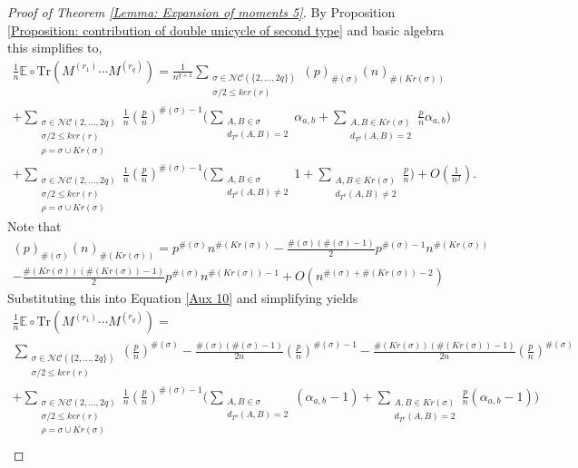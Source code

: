 \documentclass{article}
\theoremstyle{definition}
\newcommand{\E}{\mathbb{E}}
\newcommand{\NC}{\mathcal{NC}}
\newcommand{\Tr}{\text{Tr}}
\begin{document}
{\begin{proof}[Proof of Theorem \ref{Lemma: Expansion of moments 5}]
By Proposition \ref{Proposition: contribution of double unicycle of second type} and basic algebra this simplifies to,
\begin{multline}\label{Aux 10}
\frac{1}{n}\E\circ \Tr(M^{(r_1)}\cdots M^{(r_q)})= \frac{1}{n^{q+1}}\sum_{\substack{\sigma\in \NC(\{2,\dots,2q\}) \\ \sigma/2\leq ker(r)}}(p)_{\#(\sigma)}(n)_{\#(Kr(\sigma))} \\
+ \sum_{\substack{\sigma\in \NC(2,\dots,2q) \\ \sigma/2\leq ker(r) \\ \rho=\sigma\cup Kr(\sigma)}}\frac{1}{n}\left(\frac{p}{n}\right)^{\#(\sigma)-1}\Bigg(\sum_{\substack{A,B\in \sigma \\ d_{T^\rho}(A,B)=2}}\alpha_{a,b}+\sum_{\substack{A,B\in Kr(\sigma) \\ d_{T^\rho}(A,B)=2}}\frac{p}{n}\alpha_{a,b}\Bigg) \\
+ \sum_{\substack{\sigma\in \NC(2,\dots,2q) \\ \sigma/2\leq ker(r) \\ \rho=\sigma\cup Kr(\sigma)}}\frac{1}{n}\left(\frac{p}{n}\right)^{\#(\sigma)-1}\Bigg(\sum_{\substack{A,B\in \sigma \\ d_{T^\rho}(A,B)\neq 2}}1+\sum_{\substack{A,B\in Kr(\sigma) \\ d_{T^\rho}(A,B)\neq 2}}\frac{p}{n}\Bigg)+O(\frac{1}{n^2}).
\end{multline}
Note that 
\begin{multline*}
(p)_{\#(\sigma)}(n)_{\#(Kr(\sigma))}=p^{\#(\sigma)}n^{\#(Kr(\sigma))} -\frac{\#(\sigma)(\#(\sigma)-1)}{2}p^{\#(\sigma)-1}n^{\#(Kr(\sigma))}\\
-\frac{\#(Kr(\sigma))(\#(Kr(\sigma))-1)}{2}p^{\#(\sigma)}n^{\#(Kr(\sigma))-1}+O(n^{\#(\sigma)+\#(Kr(\sigma))-2})
\end{multline*}
Substituting this into Equation \ref{Aux 10} and simplifying yields
\begin{multline}\label{Aux 11}
\frac{1}{n}\E\circ \Tr(M^{(r_1)}\cdots M^{(r_q)})= \\
\sum_{\substack{\sigma\in \NC(\{2,\dots,2q\}) \\ \sigma/2\leq ker(r)}}\left(\frac{p}{n}\right)^{\#(\sigma)}-\frac{\#(\sigma)(\#(\sigma)-1)}{2n}\left(\frac{p}{n}\right)^{\#(\sigma)-1}-\frac{\#(Kr(\sigma))(\#(Kr(\sigma))-1)}{2n}\left(\frac{p}{n}\right)^{\#(\sigma)} \\
+ \sum_{\substack{\sigma\in \NC(2,\dots,2q) \\ \sigma/2\leq ker(r) \\ \rho=\sigma\cup Kr(\sigma)}}\frac{1}{n}\left(\frac{p}{n}\right)^{\#(\sigma)-1}\Bigg(\sum_{\substack{A,B\in \sigma \\ d_{T^\rho}(A,B)=2}}(\alpha_{a,b}-1)+\sum_{\substack{A,B\in Kr(\sigma) \\ d_{T^\rho}(A,B)=2}}\frac{p}{n}(\alpha_{a,b}-1)\Bigg) \\

\end{multline}
\end{proof}}
\end{document}
